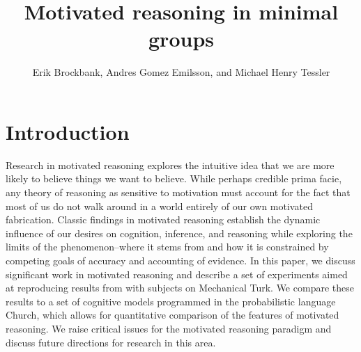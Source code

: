 \documentclass{article}
\begin{document}
 \title{Motivated reasoning in minimal groups}
\author{Erik Brockbank, Andres Gomez Emilsson, and Michael Henry Tessler} \renewcommand{\today}{Psych 241\\June 8,
2014} \maketitle

\section{Introduction}

Research in motivated reasoning explores the intuitive idea that we are more likely to believe things we want to believe. While perhaps credible prima facie, any theory of reasoning as sensitive to motivation must account for the fact that most of us do not walk around in a world entirely of our own motivated fabrication. Classic findings in motivated reasoning establish the dynamic influence of our desires on cognition, inference, and reasoning while exploring the limits of the phenomenon--where it stems from and how it is constrained by competing goals of accuracy and accounting of evidence. In this paper, we discuss significant work in motivated reasoning and describe a set of experiments aimed at reproducing results from \citep{Klein1992} with subjects on Mechanical Turk. We compare these results to a set of cognitive models programmed in the probabilistic language Church, which allows for quantitative comparison of the features of motivated reasoning. We raise critical issues for the motivated reasoning paradigm and discuss future directions for research in this area. 
\end{document}
